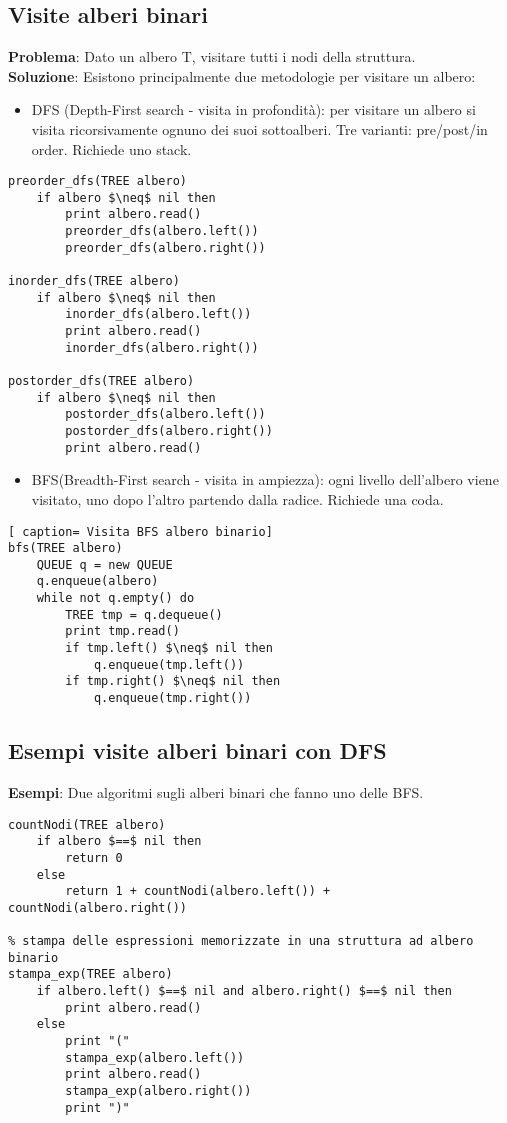 \documentclass[../cheatSheetAlgoritmi.tex]{subfiles}
\begin{document}
\subsection{Visite alberi binari}
\textbf{Problema}: Dato un albero T, visitare tutti i nodi della struttura.\\
\textbf{Soluzione}: Esistono principalmente due metodologie per visitare un albero:
\begin{itemize}
	\item DFS (Depth-First search - visita in profondità): per visitare un albero si visita ricorsivamente ognuno dei suoi sottoalberi. Tre varianti: pre/post/in order. Richiede uno stack.
\end{itemize}
\begin{lstlisting}[caption= Visita DFS albero bin]
preorder_dfs(TREE albero)
	if albero $\neq$ nil then
		print albero.read()
		preorder_dfs(albero.left())
		preorder_dfs(albero.right())

inorder_dfs(TREE albero)
	if albero $\neq$ nil then
		inorder_dfs(albero.left())
		print albero.read()
		inorder_dfs(albero.right())

postorder_dfs(TREE albero)
	if albero $\neq$ nil then
		postorder_dfs(albero.left())
		postorder_dfs(albero.right())
		print albero.read()
\end{lstlisting}
\begin{itemize}
 	\item BFS(Breadth-First search - visita in ampiezza): ogni livello dell'albero viene visitato, uno dopo l'altro partendo dalla radice. Richiede una coda. 
\end{itemize}
\begin{lstlisting}[ caption= Visita BFS albero binario]
bfs(TREE albero)
	QUEUE q = new QUEUE
	q.enqueue(albero)
	while not q.empty() do
		TREE tmp = q.dequeue()
		print tmp.read()
		if tmp.left() $\neq$ nil then
			q.enqueue(tmp.left())
		if tmp.right() $\neq$ nil then
			q.enqueue(tmp.right())
\end{lstlisting}
\newpage

\subsection{Esempi visite alberi binari con DFS}
\textbf{Esempi}: Due algoritmi sugli alberi binari che fanno uno delle BFS.
\begin{lstlisting}[caption= Esempi DFS alberi binari]
% conta i nodi di un albero binario
countNodi(TREE albero)
	if albero $==$ nil then
		return 0
	else 
		return 1 + countNodi(albero.left()) + countNodi(albero.right())

% stampa delle espressioni memorizzate in una struttura ad albero binario
stampa_exp(TREE albero)
	if albero.left() $==$ nil and albero.right() $==$ nil then
		print albero.read()
	else 
		print "("
		stampa_exp(albero.left())
		print albero.read()
		stampa_exp(albero.right())
		print ")"
\end{lstlisting}
\end{document}
